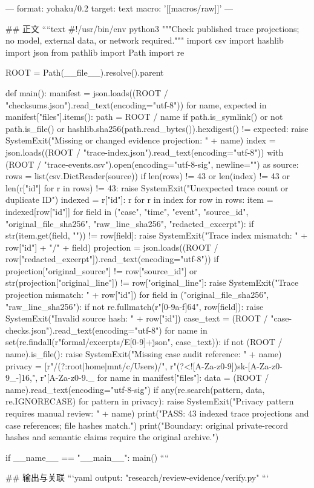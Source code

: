 ---
format: yohaku/0.2
target: text
macro: '[[macros/raw]]'
---

## 正文
````text
#!/usr/bin/env python3
"""Check published trace projections; no model, external data, or network required."""
import csv
import hashlib
import json
from pathlib import Path
import re

ROOT = Path(__file__).resolve().parent

def main():
    manifest = json.loads((ROOT / "checksums.json").read_text(encoding="utf-8"))
    for name, expected in manifest["files"].items():
        path = ROOT / name
        if path.is_symlink() or not path.is_file() or hashlib.sha256(path.read_bytes()).hexdigest() != expected:
            raise SystemExit("Missing or changed evidence projection: " + name)
    index = json.loads((ROOT / "trace-index.json").read_text(encoding="utf-8"))
    with (ROOT / "trace-events.csv").open(encoding="utf-8-sig", newline="") as source:
        rows = list(csv.DictReader(source))
    if len(rows) != 43 or len(index) != 43 or len({r["id"] for r in rows}) != 43:
        raise SystemExit("Unexpected trace count or duplicate ID")
    indexed = {r["id"]: r for r in index}
    for row in rows:
        item = indexed[row["id"]]
        for field in ("case", "time", "event", "source_id", "original_file_sha256", "raw_line_sha256", "redacted_excerpt"):
            if str(item.get(field, "")) != row[field]:
                raise SystemExit("Trace index mismatch: " + row["id"] + "/" + field)
        projection = json.loads((ROOT / row["redacted_excerpt"]).read_text(encoding="utf-8"))
        if projection["original_source"] != row["source_id"] or str(projection["original_line"]) != row["original_line"]:
            raise SystemExit("Trace projection mismatch: " + row["id"])
        for field in ("original_file_sha256", "raw_line_sha256"):
            if not re.fullmatch(r"[0-9a-f]{64}", row[field]):
                raise SystemExit("Invalid source hash: " + row["id"])
    case_text = (ROOT / "case-checks.json").read_text(encoding="utf-8")
    for name in set(re.findall(r"formal/excerpts/E[0-9]+\.json", case_text)):
        if not (ROOT / name).is_file():
            raise SystemExit("Missing case audit reference: " + name)
    privacy = [r"/(?:root|home|mnt/c/Users)/", r"(?<![A-Za-z0-9])sk-[A-Za-z0-9_-]{16,}", r"[A-Za-z0-9._%
    for name in manifest["files"]:
        data = (ROOT / name).read_text(encoding="utf-8-sig")
        if any(re.search(pattern, data, re.IGNORECASE) for pattern in privacy):
            raise SystemExit("Privacy pattern requires manual review: " + name)
    print("PASS: 43 indexed trace projections and case references; file hashes match.")
    print("Boundary: original private-record hashes and semantic claims require the original archive.")

if __name__ == "__main__":
    main()
````

## 输出与关联
```yaml
output: "research/review-evidence/verify.py"
```
